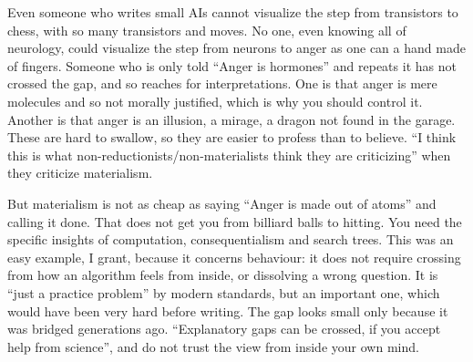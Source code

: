 Even someone who writes small AIs cannot visualize the step from transistors to chess, with so many transistors and moves. No one, even knowing all of neurology, could visualize the step from neurons to anger as one can a hand made of fingers. Someone who is only told ``Anger is hormones'' and repeats it has not crossed the gap, and so reaches for interpretations. One is that anger is mere molecules and so not morally justified, which is why you should control it. Another is that anger is an illusion, a mirage, a dragon not found in the garage. These are hard to swallow, so they are easier to profess than to believe. ``I think this is what non-reductionists/non-materialists think they are criticizing'' when they criticize materialism. 

But materialism is not as cheap as saying ``Anger is made out of atoms'' and calling it done. That does not get you from billiard balls to hitting. You need the specific insights of computation, consequentialism and search trees. This was an easy example, I grant, because it concerns behaviour: it does not require crossing from how an algorithm feels from inside, or dissolving a wrong question. It is ``just a practice problem'' by modern standards, but an important one, which would have been very hard before writing. The gap looks small only because it was bridged generations ago. ``Explanatory gaps can be crossed, if you accept help from science'', and do not trust the view from inside your own mind.

